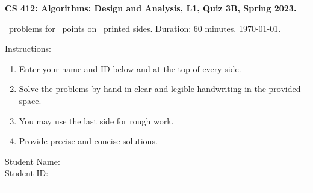 \documentclass[addpoints,a4paper]{exam}
\begin{document}
\begin{flushleft}
  { \large \textsf{\textbf{CS 412: Algorithms: Design and Analysis, L1, Quiz 3B, Spring 2023.}}}\vspace{.5em}
  
  \numquestions\ problems for \numpoints\ points on \numpages\ printed sides. Duration: 60 minutes. \today.
\end{flushleft}

Instructions:
\begin{enumerate}
\item Enter your name and ID below and at the top of every side.
\item Solve the problems by hand in clear and legible handwriting in the provided space.
\item You may use the last side for rough work.
\item Provide precise and concise solutions.
\end{enumerate}

\noindent Student Name: \hrulefill \\[5pt]
\noindent Student ID: \hrulefill \\
\rule{\textwidth}{1pt}
\end{document}
